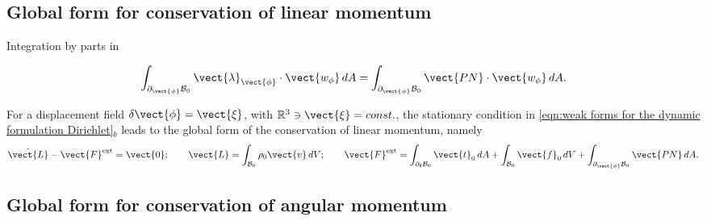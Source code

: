 \subsection{Global form for conservation of linear momentum}

Integration by parts in 

\begin{equation}
\int_{\partial_{\vect{\phi}}\mathcal{B}_0}\vect{\lambda}_{\vect{\phi}}\cdot\vect{w_{\phi}}\,dA = \int_{\partial_{\vect{\phi}}\mathcal{B}_0}\vect{PN}\cdot\vect{w_{\phi}}\,dA.
\end{equation}

For a displacement field $\delta\vect{\phi} = \vect{\xi}$, with $\mathbb{R}^3\ni\vect{\xi}=const.$, the stationary condition in \eqref{eqn:weak forms for the dynamic formulation Dirichlet}$_b$ leads to the global form of the conservation of linear momentum, namely
%
\begin{equation}\label{eqn:global conservation linear momentum_Dirichlet}
%
\dot{\vect{L}} - \vect{F}^{\text{ext}} = \vect{0};\qquad
%
{\vect{L}} = \int_{\mathcal{B}_0}\rho_0\vect{v}\,dV;\qquad
%
\vect{F}^{\text{ext}} =    
\int_{\partial_{\boldsymbol{t}}\mathcal{B}_0}\vect{t}_0\,dA
+\int_{\mathcal{B}_0}\vect{f}_0\,dV + \int_{\partial_{\vect{\phi}}\mathcal{B}_0}\vect{PN}\,dA.
\end{equation}

\subsection{Global form for conservation of angular momentum}

